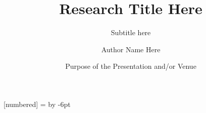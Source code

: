 \documentclass{beamer}
\begin{document}
\newenvironment{timeline}[1][node distance=1\taskwidth]
  {\par\noindent\begin{tikzpicture}[start chain,#1]}
  {\drawarrow\end{tikzpicture}\par}

\newcommand\blfootnote[1]{%
  \begingroup
  \renewcommand\thefootnote{}\footnote{#1}%
  \addtocounter{footnote}{-1}%
  \endgroup
}

\renewcommand{\figurename}{Fig.}

[numbered]
\makeatletter
  {
    \beamer@tempdim=\beamer@sidebarwidth%
    \advance\beamer@tempdim by -6pt%
    \insertverticalnavigation{\beamer@sidebarwidth}%
    \vfill
    \ifx\beamer@sidebarside\beamer@lefttext%
    \else%
      \vskip2pt%
    \fi%
  }%
\makeatother


\title[Research Title Here] %
{\bfseries{Research Title Here}}

\subtitle{Subtitle here} %

\author[Author Name] %
{Author Name Here}


\date[Purpose, Month, Year] %
{Purpose of the Presentation and/or Venue} %
\end{document}
